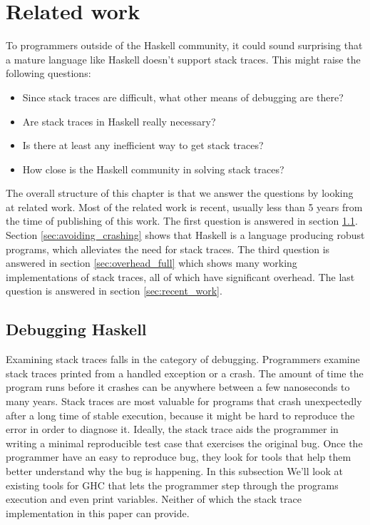 \chapter{Related work} \label{chp:related_work}

To programmers outside of the Haskell community, it could sound
surprising that a mature language like Haskell doesn't support stack
traces. This might raise the following questions:

\begin{itemize}
  \itemsep1pt\parskip0pt
  \item
    Since stack traces are difficult, what other means of debugging are
    there?
  \item
    Are stack traces in Haskell really necessary?
  \item
    Is there at least any inefficient way to get stack traces?
  \item
    How close is the Haskell community in solving stack traces?
\end{itemize}

The overall structure of this chapter is that we answer the questions
by looking at related work. Most of the
related work is recent, usually less than 5 years from the time of
publishing of this work. The first question is answered in section
\ref{sec:debugging_haskell}. Section \ref{sec:avoiding_crashing}
shows that Haskell is a language producing robust programs, which
alleviates the need for stack traces.
The third question is answered in section
\ref{sec:overhead_full} which shows many working implementations of
stack traces, all of which have significant overhead. The last question
is answered in section \ref{sec:recent_work}.

\section{Debugging Haskell} \label{sec:debugging_haskell}

Examining stack traces falls in the category of debugging. Programmers
examine stack traces printed from a handled exception or a
crash. The amount of time the program runs before it crashes can be
anywhere between a few nanoseconds to many years. Stack traces are most
valuable for programs that crash unexpectedly after a long time of
stable execution, because it might be hard to reproduce the error in
order to diagnose it. Ideally, the stack trace aids the programmer in
writing a minimal reproducible test case that exercises the original
bug. Once the programmer have an easy to reproduce bug, they look for
tools that help them better understand why the bug is happening. In this
subsection We'll look at existing tools for GHC that lets the programmer
step through the programs execution and even print variables. Neither of
which the stack trace implementation in this paper can provide.

